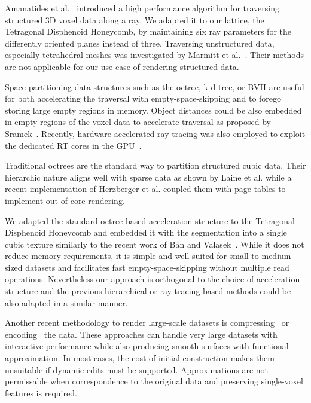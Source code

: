 \documentclass[journal]{vgtc}                     %
\begin{document}
Amanatides et al.~\cite{amanatides1987fast} introduced a high performance algorithm for traversing structured 3D voxel data along a ray. We adapted it to our lattice, the Tetragonal Disphenoid Honeycomb, by maintaining six ray parameters for the differently oriented planes instead of three. Traversing unstructured data, especially tetrahedral meshes was investigated by Marmitt et al.~\cite{marmitt2006fast}. Their methods are not applicable for our use case of rendering structured data.

Space partitioning data structures such as the octree, k-d tree, or BVH are useful for both accelerating the traversal with empty-space-skipping and to forego storing large empty regions in memory. Object distances could be also embedded in empty regions of the voxel data to accelerate traversal as proposed by Sramek~\cite{sramek1994fast}.
Recently, hardware accelerated ray tracing was also employed to exploit the dedicated RT cores in the GPU~\cite{derin2021sparse,sahistan2021ray,morrical2023quick}.

Traditional octrees are the standard way to partition structured cubic data. Their hierarchic nature aligns well with sparse data as shown by Laine et al.\cite{laine2010efficient} while a recent implementation of Herzberger et al.\cite{herzberger2024residency} coupled them with page tables to implement out-of-core rendering.

We adapted the standard octree-based acceleration structure to the Tetragonal Disphenoid Honeycomb and embedded it with the segmentation into a single cubic texture similarly to the recent work of Bán and Valasek~\cite{banempty}. While it does not reduce memory requirements, it is simple and well suited for small to medium sized datasets and facilitates fast empty-space-skipping without multiple read operations. Nevertheless our approach is orthogonal to the choice of acceleration structure and the previous hierarchical or ray-tracing-based methods could be also adapted in a similar manner.

Another recent methodology to render large-scale datasets is compressing~\cite{piochowiak2024fast} or encoding~\cite{sun2024adaptive} the data. These approaches can handle very large datasets with interactive performance while also producing smooth surfaces with functional approximation. In most cases, the cost of initial construction makes them unsuitable if dynamic edits must be supported. Approximations are not permissable when correspondence to the original data and preserving single-voxel features is required.
\end{document}
